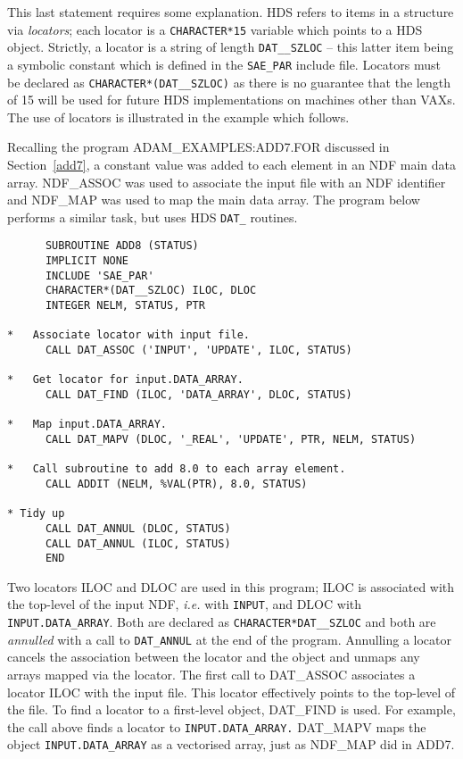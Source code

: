 This last statement requires some explanation. 
HDS refers to items in a structure via {\sl locators}; each 
locator is a {\tt CHARACTER*15} variable which points to a HDS object.
Strictly, a locator is a string of length {\tt DAT\_\_SZLOC} -- this latter
item being a symbolic constant which is defined in the {\tt SAE\_PAR} 
include file.
Locators must be declared as {\tt CHARACTER*(DAT\_\_SZLOC)} as there is no 
guarantee that the length of 15 will be 
used for future HDS implementations on machines other 
than VAXs.
The use of locators is illustrated in the example which follows.

Recalling the program ADAM\_EXAMPLES:ADD7.FOR discussed in 
Section~\ref{add7}, a constant value was added to each element in 
an NDF main data array. NDF\_ASSOC was used to associate the input file
with an NDF identifier and NDF\_MAP was used to map the main data array.
The program below performs a similar task, but uses HDS {\tt DAT\_} routines.
\begin{verbatim}
      SUBROUTINE ADD8 (STATUS)
      IMPLICIT NONE
      INCLUDE 'SAE_PAR'
      CHARACTER*(DAT__SZLOC) ILOC, DLOC
      INTEGER NELM, STATUS, PTR

*   Associate locator with input file.
      CALL DAT_ASSOC ('INPUT', 'UPDATE', ILOC, STATUS)

*   Get locator for input.DATA_ARRAY.
      CALL DAT_FIND (ILOC, 'DATA_ARRAY', DLOC, STATUS)

*   Map input.DATA_ARRAY.
      CALL DAT_MAPV (DLOC, '_REAL', 'UPDATE', PTR, NELM, STATUS)

*   Call subroutine to add 8.0 to each array element.
      CALL ADDIT (NELM, %VAL(PTR), 8.0, STATUS)

* Tidy up
      CALL DAT_ANNUL (DLOC, STATUS)
      CALL DAT_ANNUL (ILOC, STATUS)
      END
\end{verbatim}
Two locators ILOC and DLOC are used in this program; ILOC  is associated
with the top-level of the input NDF, {\it i.e.} with {\tt INPUT}, and DLOC 
with {\tt INPUT.DATA\_ARRAY}.
Both are declared as
{\tt CHARACTER*DAT\_\_SZLOC} and both are {\sl annulled\/} with a call
to {\tt DAT\_ANNUL} at the end of the program. 
Annulling a locator cancels the association between the locator and the 
object and unmaps any arrays mapped via the locator.
The first call to DAT\_ASSOC associates a locator ILOC with the input file.
This locator effectively points to the top-level of the file.
To find a locator to a first-level object, DAT\_FIND is used.
For example, the call above finds a locator to {\tt INPUT.DATA\_ARRAY.}
DAT\_MAPV maps the object {\tt INPUT.DATA\_ARRAY} as a vectorised array,
just as NDF\_MAP did in ADD7.

